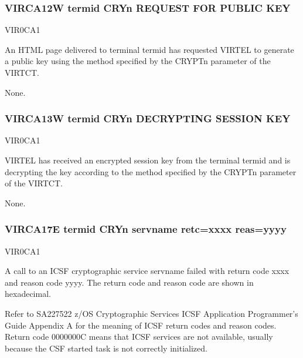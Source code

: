 \documentclass[letterpaper,10pt,english]{sphinxmanual}
\begin{document}
\subsubsection{VIRCA12W termid CRYn REQUEST FOR PUBLIC KEY}
\label{\detokenize{messages:virca12w-termid-cryn-request-for-public-key}}\begin{description}
\sphinxAtStartPar
VIR0CA1

\sphinxAtStartPar
An HTML page delivered to terminal termid has requested VIRTEL to generate a public key using the method specified by the CRYPTn parameter of the VIRTCT.

\sphinxAtStartPar
None.

\end{description}


\subsubsection{VIRCA13W termid CRYn DECRYPTING SESSION KEY}
\label{\detokenize{messages:virca13w-termid-cryn-decrypting-session-key}}\begin{description}
\sphinxAtStartPar
VIR0CA1

\sphinxAtStartPar
VIRTEL has received an encrypted session key from the terminal termid and is decrypting the key according to the method specified by the CRYPTn parameter of the VIRTCT.

\sphinxAtStartPar
None.

\end{description}


\subsubsection{VIRCA17E termid CRYn  servname retc=xxxx reas=yyyy}
\label{\detokenize{messages:virca17e-termid-cryn-error-servname-retc-xxxx-reas-yyyy}}\begin{description}
\sphinxAtStartPar
VIR0CA1

\sphinxAtStartPar
A call to an ICSF cryptographic service servname failed with return code xxxx and reason code yyyy. The return code and reason code are shown in hexadecimal.

\sphinxAtStartPar
Refer to SA22\sphinxhyphen{}7522 z/OS Cryptographic Services ICSF Application Programmer’s Guide Appendix A for the meaning of ICSF return codes and reason codes. Return code 0000000C means that ICSF services are not available, usually because the CSF started task is not correctly initialized.

\end{description}
\end{document}
